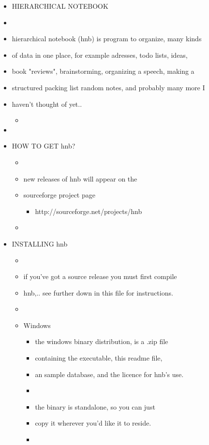 \documentclass{article}
\begin{document}
\begin{itemize}
	\item HIERARCHICAL NOTEBOOK
	\item  
	\item hierarchical notebook (hnb) is program to organize, many kinds
	\item of data in one place, for example adresses, todo lists, ideas,
	\item book "reviews", brainstorming, organizing a speech, making a 
	\item structured packing list random notes, and probably many more I 
	\item haven't thought of yet..
	  \begin{itemize}
		\item 
	  \end{itemize}

	\item  
	\item HOW TO GET hnb?
	  \begin{itemize}
		\item 
		\item new releases of hnb will appear on the
		\item sourceforge project page
		  \begin{itemize}
			\item http://sourceforge.net/projects/hnb
		  \end{itemize}

		\item 
	  \end{itemize}

	\item INSTALLING hnb
	  \begin{itemize}
		\item 
		\item if you've got a source release you must first compile
		\item hnb,.. see further down in this file for instructions.
		\item 
		\item Windows
		  \begin{itemize}
			\item the windows binary distribution, is a .zip file
			\item containing the executable, this readme file, 
			\item an sample database, and the licence for hnb's use.
			\item 
			\item the binary is standalone, so you can just
			\item copy it wherever you'd like it to reside.
			\item 
		  \end{itemize}


\end{itemize}
\end{itemize}
\end{document}
